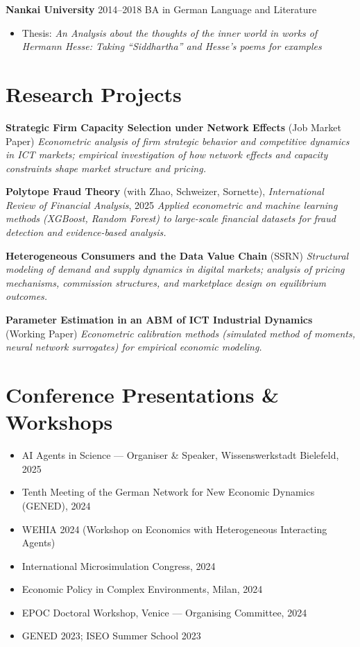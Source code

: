 \documentclass[a4paper,11pt]{article}
\begin{document}
\textbf{Nankai University} \hfill 2014–2018  
\newline BA in German Language and Literature
\begin{itemize}
    \item Thesis: \textit{An Analysis about the thoughts of the inner world in works of Hermann Hesse: Taking “Siddhartha” and Hesse’s poems for examples}
\end{itemize}


\section{Research Projects}

\textbf{Strategic Firm Capacity Selection under Network Effects} (Job Market Paper)  
\emph{Econometric analysis of firm strategic behavior and competitive dynamics in ICT markets; empirical investigation of how network effects and capacity constraints shape market structure and pricing.}

\textbf{Polytope Fraud Theory} (with Zhao, Schweizer, Sornette), \emph{International Review of Financial Analysis}, 2025  
\emph{Applied econometric and machine learning methods (XGBoost, Random Forest) to large-scale financial datasets for fraud detection and evidence-based analysis.}

\textbf{Heterogeneous Consumers and the Data Value Chain} (SSRN)  
\emph{Structural modeling of demand and supply dynamics in digital markets; analysis of pricing mechanisms, commission structures, and marketplace design on equilibrium outcomes.}

\textbf{Parameter Estimation in an ABM of ICT Industrial Dynamics} (Working Paper)  
\emph{Econometric calibration methods (simulated method of moments, neural network surrogates) for empirical economic modeling.}

\section{Conference Presentations \& Workshops}

\begin{itemize}
\item AI Agents in Science — Organiser \& Speaker, Wissenswerkstadt Bielefeld, 2025  
\item Tenth Meeting of the German Network for New Economic Dynamics (GENED), 2024  
\item WEHIA 2024 (Workshop on Economics with Heterogeneous Interacting Agents)  
\item International Microsimulation Congress, 2024  
\item Economic Policy in Complex Environments, Milan, 2024  
\item EPOC Doctoral Workshop, Venice — Organising Committee, 2024  
\item GENED 2023; ISEO Summer School 2023  
\end{itemize}
\end{document}
